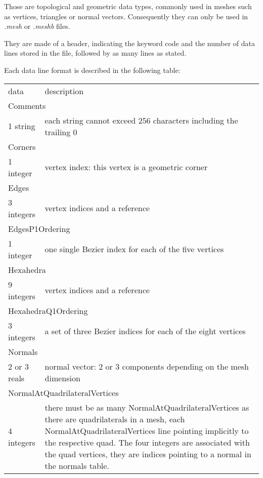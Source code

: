 \documentclass[a4paper,12pt]{article}
\begin{document}
Those are topological and geometric data types, commonly used in meshes such as vertices, triangles or normal vectors. Consequently they can only be used in \emph{.mesh} or \emph{.meshb} files.

They are made of a header, indicating the keyword code and the number of data lines stored in the file, followed by as many lines as stated.

Each data line format is described in the following table:

\setlongtables
\begin{longtable}{|m{4cm}|m{11cm}|}
\endhead
\endfoot

\hline
\multicolumn{2}{|l|}{keyword} \\
\hline
data & description \\
\hline\hline

\multicolumn{2}{|l|}{Comments} \\
\hline
1 string & each string cannot exceed 256 characters including the trailing 0 \\
\hline\hline

\multicolumn{2}{|l|}{Corners} \\
\hline
1 integer & vertex index: this vertex is a geometric corner \\
\hline\hline

\multicolumn{2}{|l|}{Edges} \\
\hline
3 integers & vertex indices and a reference \\
\hline\hline

\multicolumn{2}{|l|}{EdgesP1Ordering} \\
\hline
1 integer & one single Bezier index for each of the five vertices \\
\hline\hline

\multicolumn{2}{|l|}{Hexahedra} \\
\hline
9 integers & vertex indices and a reference \\
\hline\hline

\multicolumn{2}{|l|}{HexahedraQ1Ordering} \\
\hline
3 integers & a set of three Bezier indices for each of the eight vertices \\
\hline\hline

\multicolumn{2}{|l|}{Normals} \\
\hline
2 or 3 reals & normal vector: 2 or 3 components depending on the mesh dimension \\
\hline\hline

\multicolumn{2}{|l|}{NormalAtQuadrilateralVertices} \\
\hline
4 integers & there must be as many NormalAtQuadrilateralVertices as there are quadrilaterals in a mesh, each NormalAtQuadrilateralVertices line pointing implicitly to the respective quad. The four integers are associated with the quad vertices, they are indices pointing to a normal in the normals table. \\
\hline\hline


\end{longtable}
\end{document}
